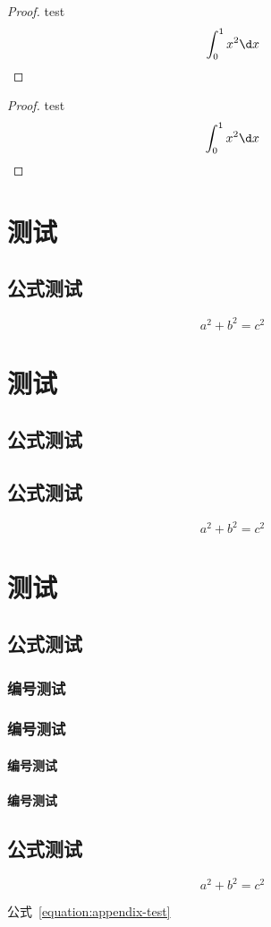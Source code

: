 \documentclass[type = doctor]{whu-thesis}
\begin{document}
\begin{proof}
  test
  \[
    \int_{0}^{1} x^2 \d x
  \]
\end{proof}

\begin{proof}
  test
  \[
    \int_{0}^{1} x^2 \d x \qedhere
  \]
\end{proof}


\chapter{测试}

\section{公式测试}

\begin{equation}
  a^2 + b^2 = c^2
\end{equation}


\nocite{*}



\appendix

\chapter{测试}

\section{公式测试}
\section{公式测试}

\begin{equation}
  a^2 + b^2 = c^2
\end{equation}

\chapter{测试}

\section{公式测试}
\subsection{编号测试}
\subsection{编号测试}
\subsubsection{编号测试}
\subsubsection{编号测试}

\section{公式测试}

\begin{equation}\label{equation:appendix-test}
  a^2 + b^2 = c^2
\end{equation}

公式~\eqref{equation:appendix-test}
\end{document}
